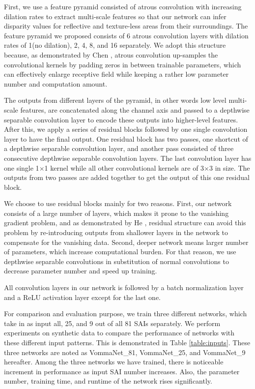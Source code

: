 \documentclass[10pt,twocolumn,letterpaper]{article}
\begin{document}
First, we use a feature pyramid consisted of atrous convolution with increasing dilation rates to extract multi-scale features so that our network can infer disparity values for reflective and texture-less areas from their surroundings. The feature pyramid we proposed consists of 6 atrous convolution layers with dilation rates of 1(no dilation), 2, 4, 8, and 16 separately. We adopt this structure because, as demonstrated by Chen \etal\cite{chen2018deeplab}, atrous convolution up-samples the convolutional kernels by padding zeros in between trainable parameters, which can effectively enlarge receptive field while keeping a rather low parameter number and computation amount.

The outputs from different layers of the pyramid, in other words low level multi-scale features, are concatenated along the channel axis and passed to a depthwise separable convolution layer to encode these outputs into higher-level features. After this, we apply a series of residual blocks followed by one single convolution layer to have the final output. One residual block has two passes, one shortcut of a depthwise separable convolution layer, and another pass consisted of three consecutive depthwise separable convolution layers. The last convolution layer has one single 1$\times$1 kernel while all other convolutional kernels are of 3$\times$3 in size. The outputs from two passes are added together to get the output of this one residual block.

We choose to use residual blocks mainly for two reasons. First, our network consists of a large number of layers, which makes it prone to the vanishing gradient problem, and as demonstrated by He \etal\cite{he2016deep}, residual structure can avoid this problem by re-introducing outputs from shallower layers in the network to compensate for the vanishing data. Second, deeper network means larger number of parameters, which increase computational burden. For that reason, we use depthwise separable convolutions in substitution of normal convolutions to decrease parameter number and speed up training.

All convolution layers in our network is followed by a batch normalization layer and a ReLU activation layer except for the last one.


For comparison and evaluation purpose, we train three different networks, which take in as input all, 25, and 9 out of all 81 SAIs separately. We perform experiments on synthetic data to compare the performance of networks with these different input patterns. This is demonstrated in Table \ref{table:inputs}. These three networks are noted as VommaNet\_81, VommaNet\_25, and VommaNet\_9 hereafter. Among the three networks we have trained, there is noticeable increment in performance as input SAI number increases. Also, the parameter number, training time, and runtime of the network rises significantly.
\end{document}
